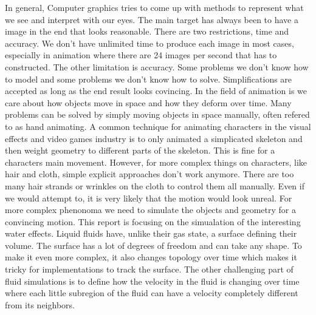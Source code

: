 In general, Computer graphics tries to come up with methods to represent what we see and interpret with our eyes. The main target has always been to have a image in the end that looks reasonable. There are two restrictions, time and accuracy. We don't have unlimited time to produce each image in most cases, especially in animation where there are 24 images per second that has to constructed. The other limitation is accuracy. Some problems we don't know how to model and some problems we don't know how to solve. Simplifications are accepted as long as the end result looks covincing. 
\newline
\newline
In the field of animation is we care about how objects move in space and how they deform over time. Many problems can be solved by simply moving objects in space manually, often refered to as hand animating. A common technique for animating characters in the visual effects and video games industry is to only animated a simplicated skeleton and then weight geometry to different parts of the skeleton. This is fine for a characters main movement. However, for more complex things on characters, like hair and cloth, simple explicit approaches don't work anymore. There are too many hair strands or wrinkles on the cloth to control them all manually. Even if we would attempt to, it is very likely that the motion would look unreal. For more complex phenonoma we need to simulate the objects and geometry for a convincing motion.
\newline
\newline
This report is focusing on the simualation of the interesting water effects. Liquid fluids have, unlike their gas state, a surface defining their volume. The surface has a lot of degrees of freedom and can take any shape. To make it even more complex, it also changes topology over time which makes it tricky for implementations to track the surface. The other challenging part of fluid simulations is to define how the velocity in the fluid is changing over time where each little subregion of the fluid can have a velocity completely different from its neighbors. 
